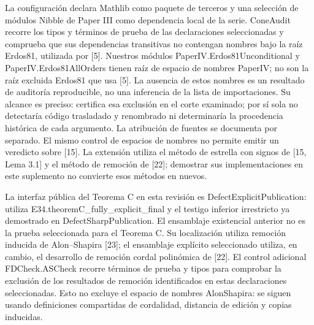 \documentclass[spanish,11pt,a4paper]{article}
\begin{document}
La configuración declara Mathlib como paquete de terceros y una selección de módulos {\ttfamily\small Nibble} de Paper III como dependencia local de la serie. {\ttfamily\small ConeAudit} recorre los tipos y términos de prueba de las declaraciones seleccionadas y comprueba que sus dependencias transitivas no contengan nombres bajo la raíz {\ttfamily\small Erdos81}, utilizada por {[}5{]}. Nuestros módulos {\ttfamily\small PaperIV.\discretionary{\hbox{\ensuremath{\hookrightarrow}}}{}{}Erdos81Uncon\discretionary{\hbox{\ensuremath{\hookrightarrow}}}{}{}ditional} y {\ttfamily\small PaperIV.\discretionary{\hbox{\ensuremath{\hookrightarrow}}}{}{}Erdos81AllOr\discretionary{\hbox{\ensuremath{\hookrightarrow}}}{}{}ders} tienen raíz de espacio de nombres {\ttfamily\small PaperIV}; no son la raíz excluida Erdos81 que usa {[}5{]}. La ausencia de estos nombres es un resultado de auditoría reproducible, no una inferencia de la lista de importaciones. Su alcance es preciso: certifica esa exclusión en el corte examinado; por sí sola no detectaría código trasladado y renombrado ni determinaría la procedencia histórica de cada argumento. La atribución de fuentes se documenta por separado. El mismo control de espacios de nombres no permite emitir un veredicto sobre {[}15{]}. La extensión utiliza el método de estrella con signos de {[}15, Lema 3.1{]} y el método de remoción de {[}22{]}; demostrar sus implementaciones en este suplemento no convierte esos métodos en nuevos.

La interfaz pública del Teorema C en esta revisión es {\ttfamily\small DefectExplic\discretionary{\hbox{\ensuremath{\hookrightarrow}}}{}{}itPublicatio\discretionary{\hbox{\ensuremath{\hookrightarrow}}}{}{}n}: utiliza {\ttfamily\small E34.\discretionary{\hbox{\ensuremath{\hookrightarrow}}}{}{}theoremC\_\discretionary{\hbox{\ensuremath{\hookrightarrow}}}{}{}fully\_\discretionary{\hbox{\ensuremath{\hookrightarrow}}}{}{}explicit\_\discretionary{\hbox{\ensuremath{\hookrightarrow}}}{}{}final} y el testigo inferior irrestricto ya demostrado en {\ttfamily\small DefectSharpP\discretionary{\hbox{\ensuremath{\hookrightarrow}}}{}{}ublication}. El ensamblaje existencial anterior no es la prueba seleccionada para el Teorema C. Su localización utiliza remoción inducida de Alon--Shapira {[}23{]}; el ensamblaje explícito seleccionado utiliza, en cambio, el desarrollo de remoción cordal polinómica de {[}22{]}. El control adicional {\ttfamily\small FDCheck.\discretionary{\hbox{\ensuremath{\hookrightarrow}}}{}{}ASCheck} recorre términos de prueba y tipos para comprobar la exclusión de los resultados de remoción identificados en estas declaraciones seleccionadas. Esto no excluye el espacio de nombres {\ttfamily\small AlonShapira}: se siguen usando definiciones compartidas de cordalidad, distancia de edición y copias inducidas.
\end{document}

